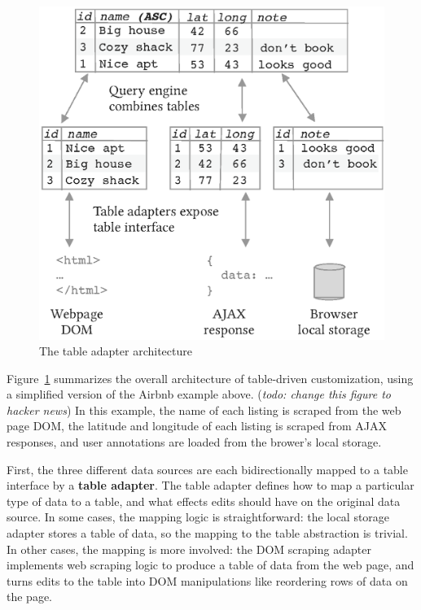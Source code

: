 \documentclass[sigplan,screen,10pt,anonymous,review]{acmart}
\begin{document}
\begin{figure}
\hypertarget{fig:table-adapter}{%
\centering
\includegraphics[width=\columnwidth]{media/table-adapter.eps}
\caption{The table adapter architecture}\label{fig:table-adapter}
}
\end{figure}

Figure~\ref{fig:table-adapter} summarizes the overall architecture of
table-driven customization, using a simplified version of the Airbnb
example above. (\emph{todo: change this figure to hacker news}) In this
example, the name of each listing is scraped from the web page DOM, the
latitude and longitude of each listing is scraped from AJAX responses,
and user annotations are loaded from the brower's local storage.

First, the three different data sources are each bidirectionally mapped
to a table interface by a \textbf{table adapter}. The table adapter
defines how to map a particular type of data to a table, and what
effects edits should have on the original data source. In some cases,
the mapping logic is straightforward: the local storage adapter stores a
table of data, so the mapping to the table abstraction is trivial. In
other cases, the mapping is more involved: the DOM scraping adapter
implements web scraping logic to produce a table of data from the web
page, and turns edits to the table into DOM manipulations like
reordering rows of data on the page.
\end{document}

